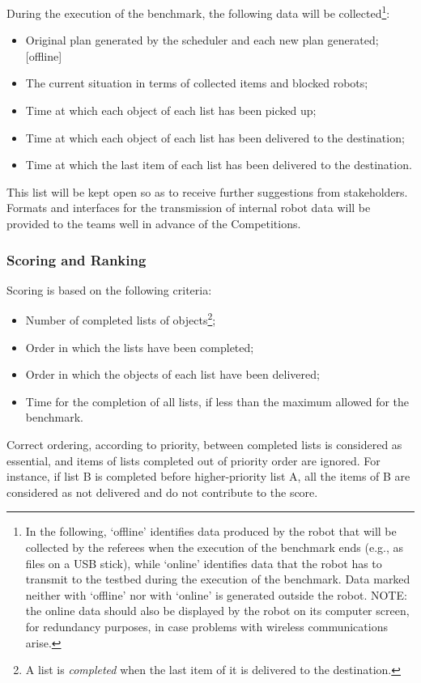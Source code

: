 During the execution of the benchmark, the following data will be collected\footnote{In the following, `offline' identifies data produced by the robot that will be collected by the referees when the execution of the benchmark ends (e.g., as files on a USB stick), while `online' identifies data that the robot has to transmit to the testbed during the execution of the benchmark. Data marked neither with `offline' nor with `online' is generated outside the robot. NOTE: the online data should also be displayed by the robot on its computer screen, for redundancy purposes, in case problems with wireless communications arise.}:
%
\begin{itemize}
\item Original plan generated by the scheduler and each new plan generated; [offline]
\item The current situation in terms of collected items and blocked robots;
\item Time at which each object of each list has been picked up;
\item Time at which each object of each list has been delivered to the destination;
\item Time at which the last item of each list has been delivered to the destination.
\end{itemize}
%
This list will be kept open so as to receive further suggestions from stakeholders.
Formats and interfaces for the transmission of internal robot data will be provided to the teams well in advance of the Competitions.

\subsubsection{Scoring and Ranking}
\label{sssec:PlanningSchedulingScoring}

Scoring is based on the following criteria:
%
\begin{itemize}
\item Number of completed lists of objects\footnote{A list is \textit{completed} when the last item of it is delivered to the destination.};
\item Order in which the lists have been completed;
\item Order in which the objects of each list have been delivered;
\item Time for the completion of all lists, if less than the maximum allowed for the benchmark.
\end{itemize}
%
Correct ordering, according to priority, between completed lists is considered as essential, and items of lists completed out of priority order are ignored. For instance, if list B is completed before higher-priority list A, all the items of B are considered as not delivered and do not contribute to the score.

